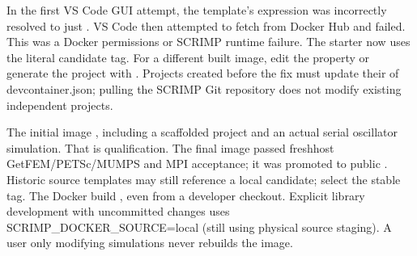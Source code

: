 \documentclass[letterpaper,10pt,english]{sphinxmanual}
\begin{document}
\sphinxAtStartPar
In the first VS Code GUI attempt, the template’s expression
was incorrectly resolved to just . VS Code
then attempted to fetch  from Docker Hub and
failed. This was  a Docker permissions or SCRIMP runtime
failure. The starter now uses the literal candidate tag. For a
different built image, edit the  property or generate
the project with . Projects created before
the fix must update their  of devcontainer.json;
pulling the SCRIMP Git repository does not modify existing
independent projects.

\sphinxAtStartPar
The initial  image , including a scaffolded project and an
actual serial oscillator simulation. That is 
qualification. The final  image passed fresh\sphinxhyphen{}host GetFEM/PETSc/MUMPS
and MPI acceptance; it was promoted  to public
. Historic source templates may
still reference a local  candidate; select the stable tag. The Docker build , even from a developer checkout.
Explicit library development with uncommitted changes uses
SCRIMP\_DOCKER\_SOURCE=local (still using physical source staging).
A user only modifying simulations never rebuilds the image.
\end{document}
